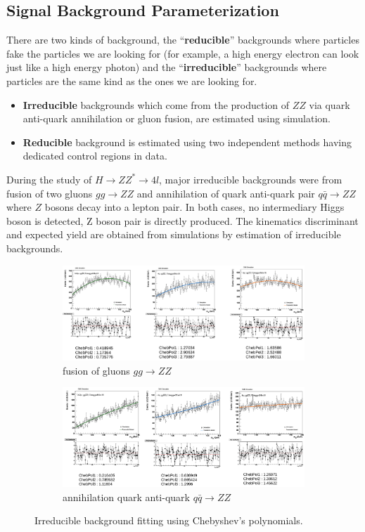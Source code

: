 \subsection{Signal Background Parameterization}
There are two kinds of background, the ``\textbf{reducible}'' backgrounds where particles fake the particles we are looking for (for example, a high energy electron can look just like a high energy photon) and the ``\textbf{irreducible}'' backgrounds where particles are the same kind as the ones we are looking for. 
\begin{itemize}
    \item \textbf{Irreducible} backgrounds which come from the production of $ZZ$ via quark anti-quark annihilation or gluon fusion, are estimated using simulation.
    \item  \textbf{Reducible} background is estimated using two independent methods having dedicated control regions in data.
\end{itemize}
During the study of $H \rightarrow Z Z^* \rightarrow 4l$, major irreducible backgrounds were from fusion of two gluons $gg \rightarrow ZZ$ and annihilation of quark anti-quark pair $q \bar{q} \rightarrow ZZ$ where $Z$ bosons decay into a lepton pair. In both cases, no intermediary Higgs boson is detected, Z boson pair is directly produced. The kinematics discriminant and expected yield are obtained from simulations by estimation of irreducible backgrounds.\\
\begin{figure}[h]
    \centering
    \begin{subfigure}[b]{0.8\textwidth}
     \includegraphics[width=\textwidth]{images/be.png}
     \caption{fusion of gluons $gg \rightarrow ZZ$}
     \label{fig:gg}
    \end{subfigure}
    \vfill
    \begin{subfigure}[b]{0.8\textwidth}
    \includegraphics[width=\textwidth]{images/be1.png}
    \caption{annihilation quark anti-quark $q \bar{q} \rightarrow ZZ$ }
     \label{fig:qq}
    \end{subfigure}
     \caption{Irreducible background fitting using Chebyshev's polynomials.}
    \label{fig:be}
\end{figure}
